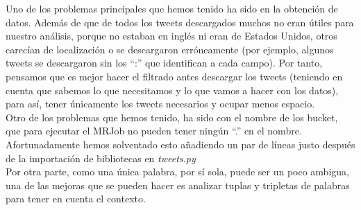 \documentclass[12pt,a4paper]{article}
\begin{document}
Uno de los problemas principales que hemos tenido ha sido en la obtención de datos. Además de que de todos los tweets descargados muchos no eran útiles para nuestro análisis, porque no estaban en inglés ni eran de Estados Unidos, otros carecían de localización o se descargaron erróneamente (por ejemplo, algunos tweets se descargaron sin los ``:'' que identifican a cada campo). Por tanto, pensamos que es mejor hacer el filtrado antes descargar los tweets (teniendo en cuenta que sabemos lo que necesitamos y lo que vamos a hacer con los datos), para así, tener únicamente los tweets necesarios y ocupar menos espacio.\\

Otro de los problemas que hemos tenido, ha sido con el nombre de los bucket, que para ejecutar el MRJob no pueden tener ningún ``.'' en el nombre. Afortunadamente hemos solventado esto añadiendo un par de líneas justo después de la importación de bibliotecas en \textit{tweets.py}\\

Por otra parte, como una única palabra, por sí sola, puede ser un poco ambigua, una de las mejoras que se pueden hacer es analizar tuplas y tripletas de palabras para tener en cuenta el contexto.\\
\end{document}
